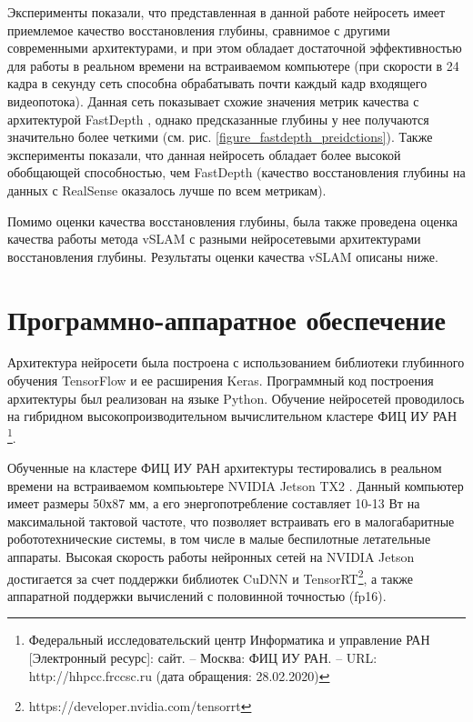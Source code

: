 \documentclass{mipt-thesis-ms}
\begin{document}
	Эксперименты показали, что представленная в данной работе нейросеть имеет приемлемое качество восстановления глубины, сравнимое с другими современными архитектурами, и при этом обладает достаточной эффективностью для работы в реальном времени на встраиваемом компьютере (при скорости в 24 кадра в секунду сеть способна обрабатывать почти каждый кадр входящего видеопотока). Данная сеть показывает схожие значения метрик качества с архитектурой FastDepth \cite{wofk2019fastdepth}, однако предсказанные глубины у нее получаются значительно более четкими (см. рис. \ref{figure_fastdepth_preidctions}). Также эксперименты показали, что данная нейросеть обладает более высокой обобщающей способностью, чем FastDepth (качество восстановления глубины на данных с RealSense оказалось лучше по всем метрикам).
	
	Помимо оценки качества восстановления глубины, была также проведена оценка качества работы метода vSLAM с разными нейросетевыми архитектурами восстановления глубины. Результаты оценки качества vSLAM описаны ниже.
	
	\section{Программно-аппаратное обеспечение}
	
	Архитектура нейросети была построена с использованием библиотеки глубинного обучения TensorFlow и ее расширения Keras. Программный код построения архитектуры был реализован на языке Python. Обучение нейросетей проводилось на гибридном высокопроизводительном вычислительном кластере ФИЦ ИУ РАН \footnote{Федеральный исследовательский центр Информатика и управление РАН [Электронный ресурс]: сайт. – Москва: ФИЦ ИУ РАН. – URL: http://hhpcc.frccsc.ru (дата обращения: 28.02.2020)}.
	
	Обученные на кластере ФИЦ ИУ РАН архитектуры тестировались в реальном времени на встраиваемом компьюьтере NVIDIA Jetson TX2 \cite{franklin2017nvidia}. Данный компьютер имеет размеры 50х87 мм, а его энергопотребление составляет 10-13 Вт на максимальной тактовой частоте, что позволяет встраивать его в малогабаритные робототехнические системы, в том числе в малые беспилотные летательные аппараты. Высокая скорость работы нейронных сетей на NVIDIA Jetson достигается за счет поддержки библиотек CuDNN и TensorRT\footnote{https://developer.nvidia.com/tensorrt}, а также аппаратной поддержки вычислений с половинной точностью (fp16).
	
\end{document}
